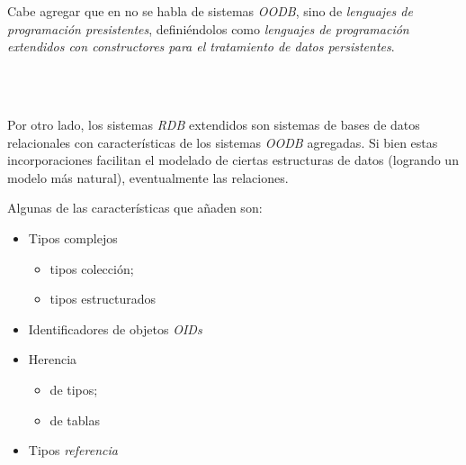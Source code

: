Cabe agregar que en \cite{silberschatz} no se habla de sistemas \emph{OODB}, sino de \emph{lenguajes de programación presistentes}, definiéndolos como \emph{lenguajes de programación extendidos con constructores para el tratamiento de datos persistentes}.

\\~

Por otro lado, los sistemas \emph{RDB} extendidos son sistemas de bases de datos relacionales con características de los sistemas \emph{OODB} agregadas. Si bien estas incorporaciones facilitan el modelado de ciertas estructuras de datos (logrando un modelo más natural), eventualmente  las relaciones.

Algunas de las características que añaden son:

\begin{itemize}
    \item Tipos complejos
        \begin{itemize}
            \item tipos colección;
            \item tipos estructurados
        \end{itemize}
    \item Identificadores de objetos \emph{OIDs} 
    \item Herencia
        \begin{itemize}
            \item de tipos;
            \item de tablas
        \end{itemize}
    \item Tipos \emph{referencia} 
\end{itemize}






\clearpage




